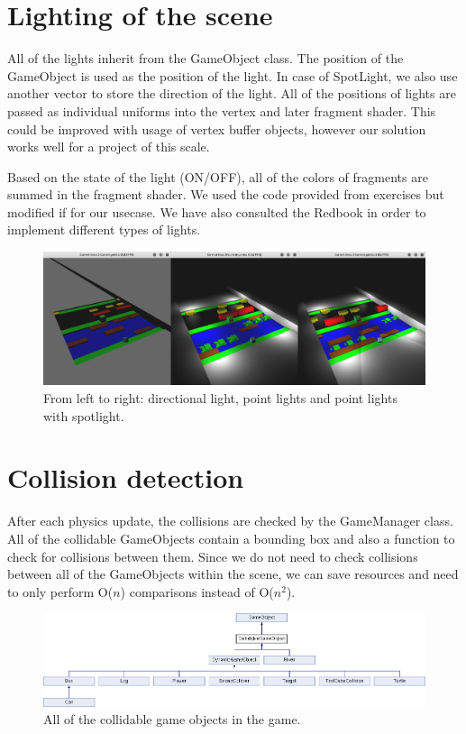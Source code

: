 \documentclass[a4paper,10pt]{article}
\begin{document}
\section{Lighting of the scene}
All of the lights inherit from the GameObject class. The position of the GameObject is used as the position of the light. In case of SpotLight, we also use another vector to store the direction of the light. All of the positions of lights are passed as individual uniforms into the vertex and later fragment shader. This could be improved with usage of vertex buffer objects, however our solution works well for a project of this scale.

Based on the state of the light (ON/OFF), all of the colors of fragments are summed in the fragment shader. We used the code provided from exercises but modified if for our usecase. We have also consulted the Redbook in order to implement different types of lights.

\begin{figure}[!htb]
	\centering
  	\includegraphics[width=\linewidth]{images/image3.png}
  	\caption{From left to right: directional light, point lights and point lights with spotlight.}
\end{figure}

\section{Collision detection}
After each physics update, the collisions are checked by the GameManager class. All of the collidable GameObjects contain a bounding box and also a function to check for collisions between them. Since we do not need to check collisions between all of the GameObjects within the scene, we can save resources and need to only perform O($n$) comparisons instead of O($n^{2}$).

\begin{figure}[!htb]
	\centering
  	\includegraphics[width=\linewidth]{images/image5.png}
  	\caption{All of the collidable game objects in the game.}
\end{figure}
\end{document}
